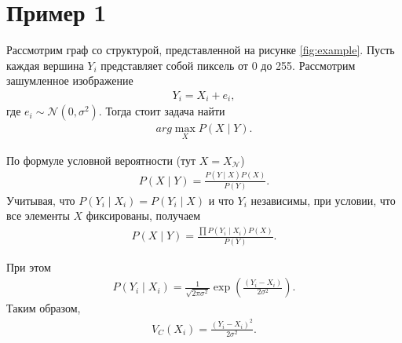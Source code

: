 \documentclass[12pt]{article}
\begin{document}
\section{Пример 1}
Рассмотрим граф со структурой, представленной на рисунке \ref{fig:example}.
Пусть каждая вершина $Y_i$ представляет собой пиксель от 0 до 255.
Рассмотрим зашумленное изображение 
\begin{gather*}
Y_i = X_i + e_i, 
\end{gather*}
где $e_i \sim \mathcal{N}(0, \sigma^2)$.
Тогда стоит задача найти 
\begin{gather*}
arg\max\limits_X P(X \mid Y).
\end{gather*}

По формуле условной вероятности (тут $X = X_\mathcal{N}$)
\begin{gather*}
P(X\mid Y) = \frac{P(Y\mid X)P(X)}{P(Y)}.
\end{gather*}
Учитывая, что $P(Y_i\mid X_i) =  P(Y_i\mid X)$ и что $Y_i$ независимы, при условии, что все элементы $X$ фиксированы, получаем
\begin{gather*}
P(X\mid Y) = \frac{\prod P(Y_i\mid X_i)P(X)}{P(Y)}.
\end{gather*}

При этом 
\begin{gather*}
P(Y_i\mid X_i) = \frac{1}{\sqrt{2\pi\sigma^2}} \exp(\frac{(Y_i - X_i)}{2\sigma^2}).
\end{gather*}
Таким образом, 
\begin{gather*}
V_C(X_i) = \frac{(Y_i - X_i)^2}{2\sigma^2}.
\end{gather*}
\end{document}
